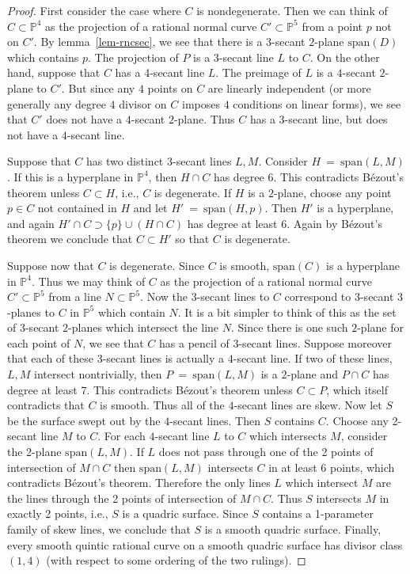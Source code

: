 \documentclass[twoside,12pt,reqno]{amsart}
\theoremstyle{plain}
\theoremstyle{definition}
\newcommand{\PP}{\mathbb{P}}
\def\ps{\vspace{4pt}}
\begin{document}
\begin{proof}
First consider the case where $C$ is nondegenerate.  Then we can think
of $C\subset \PP^4$ as the projection of a rational normal curve
$C'\subset \PP^5$ from a point $p$ not on $C'$.  
By lemma~\ref{lem-rncsec}, we see that there is a $3$-secant $2$-plane
$\text{span}(D)$ which contains $p$.  The projection of $P$ is a
$3$-secant line $L$ to $C$.  On the other hand, suppose that $C$ has a
4-secant line $L$.  The preimage of $L$ is a $4$-secant $2$-plane to $C'$.
But since any $4$ points on $C$ are linearly independent (or more
generally any degree $4$ divisor on $C$ imposes $4$ conditions on
linear forms), we see that $C'$ does not have a $4$-secant $2$-plane.
Thus $C$ has a $3$-secant line, but does not have a $4$-secant line.

\ps

Suppose that $C$ has two distinct $3$-secant lines $L,M$.  Consider
$H~=~\text{span}(L,M)$.  If this is a hyperplane in $\PP^4$, then $H\cap
C$ has degree $6$.  This contradicts B\'ezout's theorem unless
$C\subset H$, i.e., $C$ is degenerate.  If $H$ is a $2$-plane, choose
any point $p\in C$ not contained in $H$ and let
$H'~=~\text{span}(H,p)$.  Then $H'$ is a hyperplane, and again $H'\cap C
\supset \{p\}\cup (H\cap C)$ has degree at least $6$.  Again by
B\'ezout's theorem we conclude that $C\subset H'$ so that $C$ is
degenerate.

\ps

Suppose now that $C$ is degenerate.  Since $C$ is smooth,
$\text{span}(C)$ is a hyperplane in $\PP^4$.  Thus we may think of $C$
as the projection of a rational normal curve $C'\subset \PP^5$ from a
line $N\subset \PP^5$. 
Now the $3$-secant lines to $C$ correspond to $3$-secant $3$-planes to
$C$ in $\PP^5$ which contain $N$.  It is a bit simpler to think of
this as the set of $3$-secant $2$-planes which intersect the line
$N$.  Since there is one such $2$-plane for each point of $N$, we see
that $C$ has a pencil of $3$-secant lines.  Suppose
moreover that each of these $3$-secant lines is actually a $4$-secant
line.  If two of these lines, $L,M$ intersect nontrivially, then
$P~=~\text{span}(L,M)$ is a $2$-plane and $P\cap C$ has degree at least
$7$.  This contradicts B\'ezout's theorem unless $C\subset P$, which
itself contradicts that $C$ is smooth.  Thus all of the $4$-secant
lines are skew.  Now let $S$ be the surface swept out by the
$4$-secant lines.  Then $S$ contains $C$.  Choose any 2-secant line
$M$ to $C$.  For each $4$-secant line $L$ to $C$ which intersects $M$, 
consider the 2-plane $\text{span}(L,M)$.  If $L$ does not pass through 
one of the 2 points of intersection of $M\cap C$ then
$\text{span}(L,M)$ intersects $C$ in at least $6$ points, which
contradicts B\'ezout's theorem.  Therefore the only lines $L$ which
intersect $M$ are the lines through the 2 points of intersection of
$M\cap C$.  Thus $S$ intersects $M$ in exactly 2 points, i.e., $S$ is a 
quadric surface.  Since $S$ contains a 1-parameter family of skew
lines, we conclude that $S$ is a smooth quadric surface.  Finally,
every smooth quintic rational curve on a smooth quadric surface has
divisor class $(1,4)$ (with respect to some ordering of the two
rulings).
\end{proof}
\end{document}
